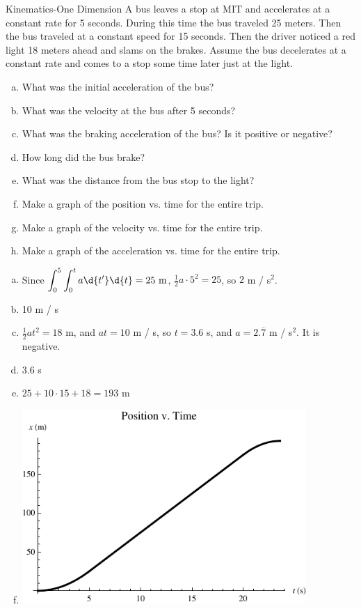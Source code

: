 \documentclass{esg8012pset}
\begin{document}
\begin{question}[Problem 2]
\begin{problem}{Kinematics-One Dimension}
  A bus leaves a stop at MIT and accelerates at a constant rate for 5 seconds. During this time the
  bus traveled 25 meters. Then the bus traveled at a constant speed for 15 seconds. Then the driver
  noticed a red light 18 meters ahead and slams on the brakes. Assume the bus decelerates at a
  constant rate and comes to a stop some time later just at the light.
  \begin{enumerate}[a)]
    \item What was the initial acceleration of the bus?
    \item What was the velocity at the bus after 5 seconds?
    \item What was the braking acceleration of the bus? Is it positive or negative?
    \item How long did the bus brake?
    \item What was the distance from the bus stop to the light?
    \item Make a graph of the position vs. time for the entire trip.
    \item Make a graph of the velocity vs. time for the entire trip.
    \item Make a graph of the acceleration vs. time for the entire trip.
  \end{enumerate}
\end{problem}
\begin{solution}
  \begin{enumerate}[a)]
    \item Since $\displaystyle \int_{0}^{5}\int_{0}^{t} a \d{t'}\d{t} = 25\ \text{m}$, $\frac{1}{2}a \cdot 5^2 = 25$, so $2$ m / s$^2$.
    \item 10 m / s
    \item $\frac{1}{2}at^2 = 18$ m, and $at = 10$ m / s, so $t = 3.6$ s, and $a = 2.\overline{7}$ m / s$^2$.  It is negative.
    \item 3.6 s
    \item $25 + 10 \cdot 15 + 18 = 193$ m
    \item \includegraphics[width=0.85\textwidth]{ps01_Plot_1}

\end{enumerate}
\end{solution}
\end{question}
\end{document}
